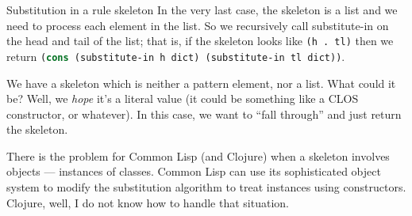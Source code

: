 \begin{algorithm}{Substitution in a rule skeleton}
 In the very last case, the
skeleton is a list and we need to process each element in the list. So
we recursively call substitute-in on the head and tail of the list; that
is, if the skeleton looks like \lstinline[language=lisp]{(h . tl)} then
we return
\lstinline[language=lisp]{(cons (substitute-in h dict) (substitute-in tl dict))}.

\label{step:algorithm:substitute-in:finished-with-list-subcases}
We have a skeleton which is neither a pattern element, nor a list. What
could it be? Well, we \emph{hope} it's a literal value (it could be
something like a CLOS constructor, or whatever). In this case, we want to ``fall
through'' and just return the skeleton.\quad\qedsymbol
\end{algorithm}


\begin{remark}
There is the problem for Common Lisp (and Clojure) when a skeleton
involves objects --- instances of classes. Common Lisp can use its
sophisticated object system to modify the substitution algorithm to
treat instances using constructors. Clojure, well, I do not know how to
handle that situation.
\end{remark}
